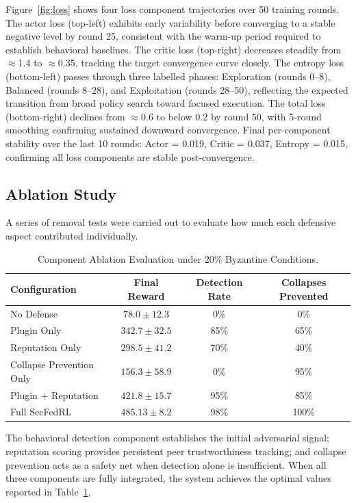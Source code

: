 \documentclass[12pt,a4paper]{article}
\begin{document}
Figure~\ref{fig:loss} shows four loss component trajectories over 50 training rounds.
The actor loss (top-left) exhibits early variability before converging to a stable
negative level by round 25, consistent with the warm-up period required to establish
behavioral baselines. The critic loss (top-right) decreases steadily from $\approx$1.4
to $\approx$0.35, tracking the target convergence curve closely. The entropy loss
(bottom-left) passes through three labelled phases: Exploration (rounds 0--8),
Balanced (rounds 8--28), and Exploitation (rounds 28--50), reflecting the expected
transition from broad policy search toward focused execution. The total loss
(bottom-right) declines from $\approx$0.6 to below 0.2 by round 50, with 5-round
smoothing confirming sustained downward convergence. Final per-component stability
over the last 10 rounds: Actor = 0.019, Critic = 0.037, Entropy = 0.015, confirming
all loss components are stable post-convergence.

\subsection{Ablation Study}

A series of removal tests were carried out to evaluate how much each defensive aspect
contributed individually.

\begin{table}[htbp]
\centering
\caption{Component Ablation Evaluation under 20\% Byzantine Conditions.}
\label{tab:ablation}
\begin{tabular}{lccc}
\toprule
\textbf{Configuration} & \textbf{Final Reward} & \textbf{Detection Rate} &
\textbf{Collapses Prevented} \\
\midrule
No Defense               & $78.0 \pm 12.3$    & 0\%  & 0\%   \\
Plugin Only              & $342.7 \pm 32.5$   & 85\% & 65\%  \\
Reputation Only          & $298.5 \pm 41.2$   & 70\% & 40\%  \\
Collapse Prevention Only & $156.3 \pm 58.9$   & 0\%  & 95\%  \\
Plugin + Reputation      & $421.8 \pm 15.7$   & 95\% & 85\%  \\
Full SecFedRL            & $485.13 \pm 8.2$   & 98\% & 100\% \\
\bottomrule
\end{tabular}
\end{table}

The behavioral detection component establishes the initial adversarial signal;
reputation scoring provides persistent peer trustworthiness tracking; and collapse
prevention acts as a safety net when detection alone is insufficient. When all three
components are fully integrated, the system achieves the optimal values reported in
Table~\ref{tab:ablation}.
\end{document}
